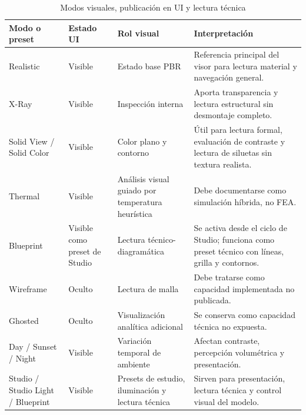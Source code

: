 \begin{table}[p]
    \caption{Modos visuales, publicación en UI y lectura técnica}
    \label{tab:modos_visuales_publicacion}
    \centering
    \footnotesize
    \setlength{\tabcolsep}{3pt}
    \renewcommand{\arraystretch}{0.78}
    \begin{tabular}{>{\RaggedRight\arraybackslash}p{2.55cm}>{\RaggedRight\arraybackslash}p{2.35cm}>{\RaggedRight\arraybackslash}p{3.0cm}>{\RaggedRight\arraybackslash}p{5.0cm}}
        \hline
        \textbf{Modo o preset} & \textbf{Estado UI} & \textbf{Rol visual} & \textbf{Interpretación} \\ \hline
        Realistic & Visible & Estado base PBR & Referencia principal del visor para lectura material y navegación general. \\
        X-Ray & Visible & Inspección interna & Aporta transparencia y lectura estructural sin desmontaje completo. \\
        Solid View / Solid Color & Visible & Color plano y contorno & Útil para lectura formal, evaluación de contraste y lectura de siluetas sin textura realista. \\
        Thermal & Visible & Análisis visual guiado por temperatura heurística & Debe documentarse como simulación híbrida, no FEA. \\
        Blueprint & Visible como preset de Studio & Lectura técnico-diagramática & Se activa desde el ciclo de Studio; funciona como preset técnico con líneas, grilla y contornos. \\
        Wireframe & Oculto & Lectura de malla & Debe tratarse como capacidad implementada no publicada. \\
        Ghosted & Oculto & Visualización analítica adicional & Se conserva como capacidad técnica no expuesta. \\
        Day / Sunset / Night & Visible & Variación temporal de ambiente & Afectan contraste, percepción volumétrica y presentación. \\
        Studio / Studio Light / Blueprint & Visible & Presets de estudio, iluminación y lectura técnica & Sirven para presentación, lectura técnica y control visual del modelo. \\ \hline
    \end{tabular}
    \par\vspace{0.5\baselineskip}
\end{table}

